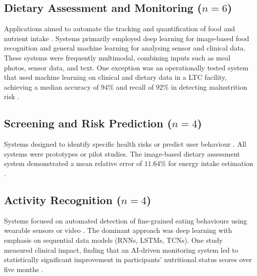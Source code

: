 \subsection{Dietary Assessment and Monitoring ($n=6$)}

Applications aimed to automate the tracking and quantification of food and nutrient intake \citep{chewADLDigitalToolkit2025,dimartinoMalnutritionRiskAssessment2021,grecoEmotionalFeaturesInteractions2021,khattakSelfAdaptiveSystem2016,kobayashiFrailtyMeterHealthy2021,seintMedicationMealIntake2018}. Systems primarily employed deep learning for image-based food recognition and general machine learning for analysing sensor and clinical data. These systems were frequently multimodal, combining inputs such as meal photos, sensor data, and text. One exception was an operationally tested system that used machine learning on clinical and dietary data in a LTC facility, achieving a median accuracy of $94\%$ and recall of $92\%$ in detecting malnutrition risk \citep{dimartinoMalnutritionRiskAssessment2021}.

\subsection{Screening and Risk Prediction ($n=4$)}

Systems designed to identify specific health risks or predict user behaviour \citep{haiSelfFeedingRobotElder2022,liKGSCSSmartCare2024,papathanailEvaluationNovelArtificial2021,spoorenImprovingRecommendationsMeals2023}. All systems were prototypes or pilot studies. The image-based dietary assessment system demonstrated a mean relative error of $11.64\%$ for energy intake estimation \citep{papathanailEvaluationNovelArtificial2021}.

\subsection{Activity Recognition ($n=4$)}

Systems focused on automated detection of fine-grained eating behaviours using wearable sensors or video \citep{ioakeimidisCanBiteDetection2024,kyritsisAssessmentRealLife2021,seokFeasibilityEfficacyTouchCare2022,wangDetectionEatingGestures2024}. The dominant approach was deep learning with emphasis on sequential data models (RNNs, LSTMs, TCNs). One study measured clinical impact, finding that an AI-driven monitoring system led to statistically significant improvement in participants' nutritional status scores over five months \citep{seokFeasibilityEfficacyTouchCare2022}.

